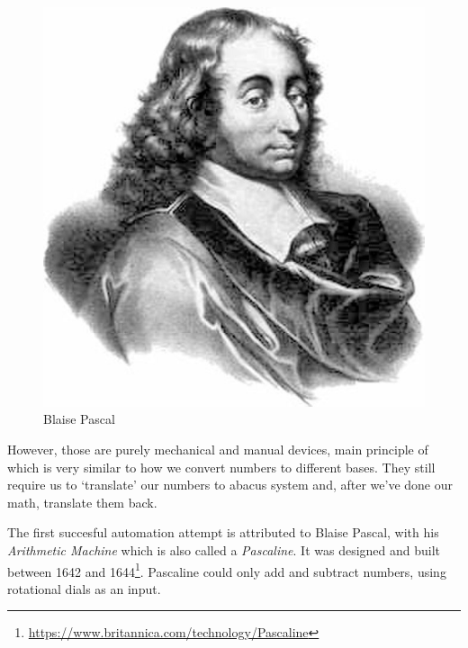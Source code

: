 \documentclass{article}
\begin{document}
            \newpage                
            \begin{figure}
                \centering
                \includegraphics[scale=0.1]{images/persons/person_blaise_pascal.jpg}
                \caption{Blaise Pascal}
            \end{figure}

            However, those are purely mechanical and manual devices, main principle of which is very similar to how we convert numbers to different bases. They still
            require us to `translate' our numbers to abacus system and, after we've done our math, translate them back. \par
            
            The first succesful automation attempt is attributed to Blaise Pascal, with his \emph{Arithmetic Machine} which is also called a \emph{Pascaline}.
            It was designed and built between 1642 and 1644\footnote{\href{https://www.britannica.com/technology/Pascaline}{https://www.britannica.com/technology/Pascaline}}. 
            Pascaline could only add and subtract numbers, using rotational dials as an input.\par
\end{document}
